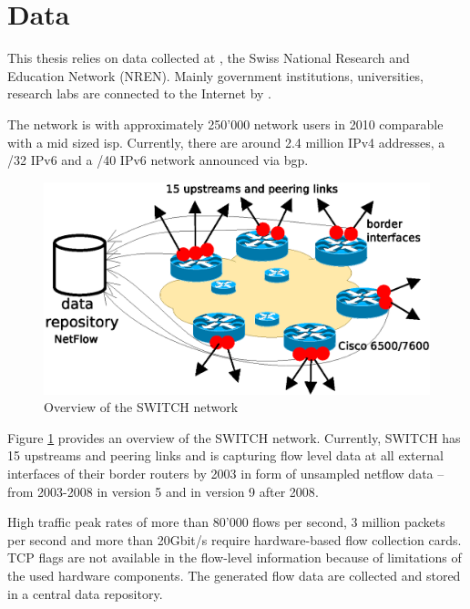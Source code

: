 \section{Data
\label{section:data}}

This thesis relies on data collected at \citet{switch}, the Swiss National 
Research and Education Network (NREN). Mainly government institutions, 
universities, research labs are connected to the Internet by \citet{switch}\citep{Schatzmann:Mining}.

The \citet{switch} network is with approximately 250'000 network users in 2010 comparable with a mid sized \gls{isp}. Currently, there are around 2.4 million \gls{IPv4} addresses, a /32 IPv6 and a /40 \gls{IPv6} network announced via \gls{bgp}\citep{Schatzmann:Tracing}.

\begin{figure}[b] 
	\centering
	\includegraphics[width=12cm]{images/network_overview.eps}
	\caption{Overview of the SWITCH network \citep{SchatzmanThesis2012}} 
	\label{fig:switch_nework}
\end{figure}

Figure \ref{fig:switch_nework} provides an overview of the SWITCH network. 
Currently, SWITCH has 15 upstreams and peering links and is capturing flow level 
data at all external interfaces of their border routers by 2003 in form of 
unsampled \gls{netflow} data -- from 2003-2008 in version 5 and in version 9 
after 2008\citep{Schatzmann:Tracing}.

High traffic peak rates of more than 80'000 flows per second, 3 million packets 
per second and more than 20Gbit/s require hardware-based flow collection 
cards\citep{Schatzmann:Tracing}. \gls{TCP} flags are not available in the 
flow-level information because of limitations of the used hardware 
components\citep{Schatzmann:Tracing}. The generated flow data are collected and 
stored in a central data repository.

